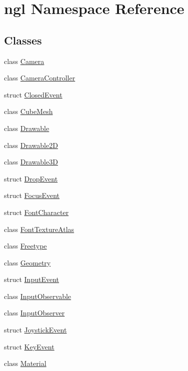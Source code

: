 \hypertarget{namespacengl}{}\section{ngl Namespace Reference}
\label{namespacengl}
\subsection*{Classes}
\begin{DoxyCompactItemize}
\item 
class \mbox{\hyperlink{classngl_1_1_camera}{Camera}}
\item 
class \mbox{\hyperlink{classngl_1_1_camera_controller}{Camera\+Controller}}
\item 
struct \mbox{\hyperlink{structngl_1_1_closed_event}{Closed\+Event}}
\item 
class \mbox{\hyperlink{classngl_1_1_cube_mesh}{Cube\+Mesh}}
\item 
class \mbox{\hyperlink{classngl_1_1_drawable}{Drawable}}
\item 
class \mbox{\hyperlink{classngl_1_1_drawable2_d}{Drawable2D}}
\item 
class \mbox{\hyperlink{classngl_1_1_drawable3_d}{Drawable3D}}
\item 
struct \mbox{\hyperlink{structngl_1_1_drop_event}{Drop\+Event}}
\item 
struct \mbox{\hyperlink{structngl_1_1_focus_event}{Focus\+Event}}
\item 
struct \mbox{\hyperlink{structngl_1_1_font_character}{Font\+Character}}
\item 
class \mbox{\hyperlink{classngl_1_1_font_texture_atlas}{Font\+Texture\+Atlas}}
\item 
class \mbox{\hyperlink{classngl_1_1_freetype}{Freetype}}
\item 
class \mbox{\hyperlink{classngl_1_1_geometry}{Geometry}}
\item 
struct \mbox{\hyperlink{structngl_1_1_input_event}{Input\+Event}}
\item 
class \mbox{\hyperlink{classngl_1_1_input_observable}{Input\+Observable}}
\item 
class \mbox{\hyperlink{classngl_1_1_input_observer}{Input\+Observer}}
\item 
struct \mbox{\hyperlink{structngl_1_1_joystick_event}{Joystick\+Event}}
\item 
struct \mbox{\hyperlink{structngl_1_1_key_event}{Key\+Event}}
\item 
class \mbox{\hyperlink{classngl_1_1_material}{Material}}

\end{DoxyCompactItemize}
